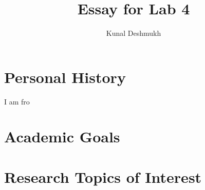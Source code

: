 \documentclass[]{article}
\title{Essay for Lab 4}
\author{Kunal Deshmukh}
\begin{document}
\maketitle 

\begin{abstract}

\end{abstract}

\section{Personal History}
 I am fro
\section{Academic Goals}
\section{Research Topics of Interest}
\end{document}
